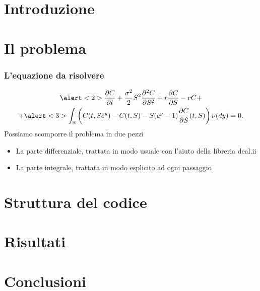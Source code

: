 \documentclass{beamer}
\newcommand{\der}[2]{\frac{\partial #1}{\partial #2}}
\newcommand{\dder}[2]{\frac{\partial^2 #1}{\partial #2^2}}
\begin{document}
\section{Introduzione}
\begin{frame}
\end{frame}

\section{Il problema}

\begin{frame}
\frametitle{L'equazione da risolvere}
\begin{multline*}
\alert<2>{\der{C}{t}+\frac{\sigma^2}{2}S^2\dder{C}{S}+r\der{C}{S}-rC}+\\ + 
\alert<3>{\int_\mathbb{R}\left(C(t,Se^y)-C(t,S)-S(e^y-1)\der{C}{S}(t,S)\right)\nu(dy)}=0.
\end{multline*}
\pause
Possiamo scomporre il problema in due pezzi
\begin{itemize}[<+->]
\item La parte differenziale, trattata in modo usuale con l'aiuto della libreria \textsf{deal.ii}
\item La parte integrale, trattata in modo esplicito ad ogni passaggio
\end{itemize}
\end{frame}
\section{Struttura del codice}

\section{Risultati}

\section{Conclusioni}
\end{document}
